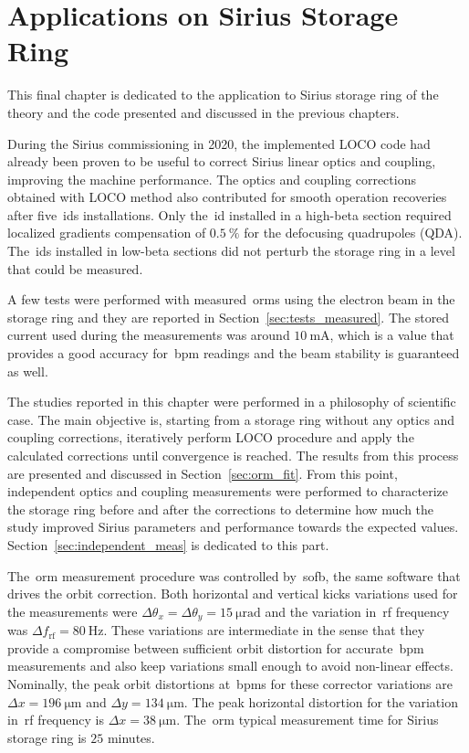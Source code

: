 \chapter{Applications on Sirius Storage Ring}

This final chapter is dedicated to the application to Sirius storage ring of the theory and the code presented and discussed in the previous chapters. 

During the Sirius commissioning in 2020, the implemented LOCO code had already been proven to be useful to correct Sirius linear optics and coupling, improving the machine performance. The optics and coupling corrections obtained with LOCO method also contributed for smooth operation recoveries after five~\glspl{id} installations. Only the~\gls{id} installed in a high-beta section required localized gradients compensation of $\SI{0.5}{\%}$ for the defocusing quadrupoles (QDA). The~\glspl{id} installed in low-beta sections did not perturb the storage ring in a level that could be measured. 

A few tests were performed with measured~\glspl{orm} using the electron beam in the storage ring and they are reported in Section~\ref{sec:tests_measured}. The stored current used during the measurements was around $\SI{10}{\milli\ampere}$, which is a value that provides a good accuracy for~\gls{bpm} readings and the beam stability is guaranteed as well.

The studies reported in this chapter were performed in a philosophy of scientific case. The main objective is, starting from a storage ring without any optics and coupling corrections, iteratively perform LOCO procedure and apply the calculated corrections until convergence is reached. The results from this process are presented and discussed in Section~\ref{sec:orm_fit}. From this point, independent optics and coupling measurements were performed to characterize the storage ring before and after the corrections to determine how much the study improved Sirius parameters and performance towards the expected values. Section~\ref{sec:independent_meas} is dedicated to this part.

The~\gls{orm} measurement procedure was controlled by~\gls{sofb}, the same software that drives the orbit correction. Both horizontal and vertical kicks variations used for the measurements were $\Delta \theta_x=\Delta \theta_y=\SI{15}{\micro\radian}$ and the variation in~\gls{rf} frequency was $\Delta f_{\mathrm{rf}} = \SI{80}{\hertz}$. These variations are intermediate in the sense that they provide a compromise between sufficient orbit distortion for accurate~\gls{bpm} measurements and also keep variations small enough to avoid non-linear effects. Nominally, the peak orbit distortions at~\glspl{bpm} for these corrector variations are $\Delta x = \SI{196}{\micro\meter}$ and $\Delta y = \SI{134}{\micro\meter}$. The peak horizontal distortion for the variation in~\gls{rf} frequency is $\Delta x = \SI{38}{\micro\meter}$. The~\gls{orm} typical measurement time for Sirius storage ring is $25$ minutes.


